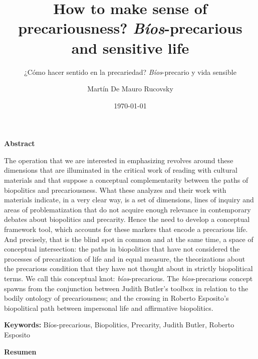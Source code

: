 \documentclass[a4paper,]{scrartcl}
\title{How to make sense of precariousness? \emph{Bíos}-precarious and
sensitive life}
\subtitle{¿Cómo hacer sentido en la precariedad? \emph{Bíos}-precario y vida
sensible}
\author{Martín De Mauro Rucovsky}
\date{\today}
\begin{document}
\maketitle


\textbf{Abstract}

The operation that we are interested in emphasizing revolves around
these dimensions that are illuminated in the critical work of reading
with cultural materials and that suppose a conceptual complementarity
between the paths of biopolitics and precariousness. What these analyzes
and their work with materials indicate, in a very clear way, is a set of
dimensions, lines of inquiry and areas of problematization that do not
acquire enough relevance in contemporary debates about biopolitics and
precarity. Hence the need to develop a conceptual framework tool, which
accounts for these markers that encode a precarious life. And precisely,
that is the blind spot in common and at the same time, a space of
conceptual intersection: the paths in biopolitics that have not
considered the processes of precarization of life and in equal measure,
the theorizations about the precarious condition that they have not
thought about in strictly biopolitical terms. We call this conceptual
knot: \emph{bíos}-precarious. The \emph{bíos}-precarious concept spawns
from the conjunction between Judith Butler's toolbox in relation to the
bodily ontology of precariousness; and the crossing in Roberto
Esposito's biopolitical path between impersonal life and affirmative
biopolitics.

\textbf{Keywords:} Bíos-precarious, Biopolitics, Precarity, Judith
Butler, Roberto Esposito

\textbf{Resumen}
\end{document}
